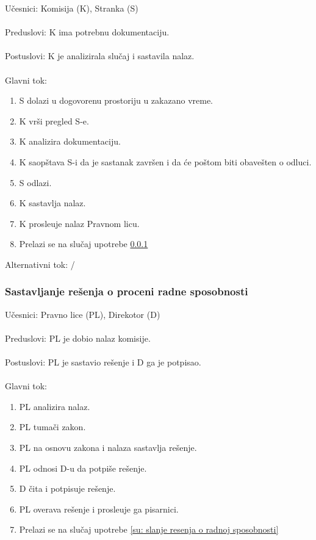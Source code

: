 \noindent U\v cesnici: Komisija (K), Stranka (S)
\\
\\ Preduslovi: K ima potrebnu dokumentaciju.
\\
\\ Postuslovi: K je analizirala slu\v caj i sastavila nalaz.
\\
\\ Glavni tok:
\begin{enumerate}
	\item S dolazi u dogovorenu prostoriju u zakazano vreme.
	\item K vr\v si pregled S-e.
	\item K analizira dokumentaciju.
	\item K saop\v stava S-i da je sastanak zavr\v sen i da \' ce po\v stom biti obave\v sten o odluci.
	\item S odlazi.
	\item K sastavlja nalaz.
	\item K prosle\dj uje nalaz Pravnom licu.
	\item Prelazi se na slu\v caj upotrebe \ref{su: resenje o rs} 
\end{enumerate}

\noindent Alternativni tok: /


\subsubsection{Sastavljanje re\v senja o proceni radne sposobnosti}
\label{su: resenje o rs}
\noindent U\v cesnici: Pravno lice (PL), Direkotor (D)
\\
\\ Preduslovi: PL je dobio nalaz komisije.
\\
\\ Postuslovi: PL je sastavio re\v senje i D ga je potpisao.
\\
\\ Glavni tok:
\begin{enumerate}
	\item PL analizira nalaz.
	\item PL tuma\v ci zakon.
	\item PL na osnovu zakona i nalaza sastavlja re\v senje.
	\item PL odnosi D-u da potpi\v se re\v senje.
	\item D \v cita i potpisuje re\v senje.
	\item PL overava re\v senje i prosle\dj uje ga pisarnici. 
	\item Prelazi se na slu\v caj upotrebe \ref{su: slanje resenja o radnoj sposobnosti}
\end{enumerate}

